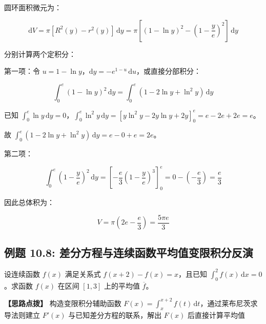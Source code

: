 \documentclass[11pt,a4paper,UTF8]{ctexart}
\begin{document}
\begin{solbox}[分步推导与答题规范]
圆环面积微元为：


\begin{equation*}
\mathrm{d}V = \pi [R^2(y) - r^2(y)]\,\mathrm{d}y = \pi \left[(1-\ln y)^2 - \left(1-\frac{y}{e}\right)^2\right]\,\mathrm{d}y
\end{equation*}


分别计算两个定积分：

第一项：令 $u = 1-\ln y$，$\mathrm{d}y = -e^{1-u}\,\mathrm{d}u$，或直接分部积分：


\begin{equation*}
\int_0^e (1-\ln y)^2\,\mathrm{d}y = \int_0^e (1 - 2\ln y + \ln^2 y)\,\mathrm{d}y
\end{equation*}


已知 $\int_0^e \ln y\,\mathrm{d}y = 0$，$\int_0^e \ln^2 y\,\mathrm{d}y = [y\ln^2 y - 2y\ln y + 2y]_0^e = e - 2e + 2e = e$。

故 $\int_0^e (1 - 2\ln y + \ln^2 y)\,\mathrm{d}y = e - 0 + e = 2e$。

第二项：


\begin{equation*}
\int_0^e \left(1-\frac{y}{e}\right)^2\,\mathrm{d}y = \left[-\frac{e}{3}\left(1-\frac{y}{e}\right)^3\right]_0^e = 0 - \left(-\frac{e}{3}\right) = \frac{e}{3}
\end{equation*}


因此总体积为：


\begin{equation*}
V = \pi \left(2e - \frac{e}{3}\right) = \frac{5\pi e}{3}
\end{equation*}

\end{solbox}


\subsection{例题 10.8: 差分方程与连续函数平均值变限积分反演}

设连续函数 $f(x)$ 满足关系式 $f(x+2) - f(x) = x$，且已知 $\int_0^2 f(x)\,\mathrm{d}x = 0$。求函数 $f(x)$ 在区间 $[1, 3]$ 上的平均值 $\overline{f}$。

\textbf{\color{DeepPurple}【思路点拨】} 构造变限积分辅助函数 $F(x) = \int_x^{x+2} f(t)\,\mathrm{d}t$，通过莱布尼茨求导法则建立 $F'(x)$ 与已知差分方程的联系，解出 $F(x)$ 后直接计算平均值
\end{document}
